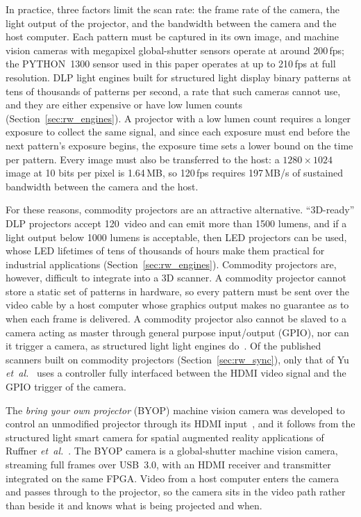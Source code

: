 \documentclass[10pt,journal,compsoc]{IEEEtran}
\newcommand{\SI}[2]{#1\,#2}
\begin{document}
In practice, three factors limit the scan rate: the frame rate of the camera, the light output of
the projector, and the bandwidth between the camera and the host computer. Each pattern must be
captured in its own image, and machine vision cameras with megapixel global-shutter sensors
operate at around \SI{200}{fps}; the PYTHON~1300 sensor used in this paper operates at up to
\SI{210}{fps} at full resolution. DLP light engines built for structured light display binary
patterns at tens of thousands of patterns per second, a rate that such cameras cannot use, and
they are either expensive or have low lumen counts (Section~\ref{sec:rw_engines}). A projector
with a low lumen count requires a longer exposure to collect the same signal, and since each
exposure must end before the next pattern's exposure begins, the exposure time sets a lower bound
on the time per pattern. Every image must also be transferred to the host: a $1280\times1024$
image at 10 bits per pixel is \SI{1.64}{MB}, so \SI{120}{fps} requires \SI{197}{MB/s} of
sustained bandwidth between the camera and the host.

For these reasons, commodity projectors are an attractive alternative. ``3D-ready'' DLP
projectors accept \SI{120}{\hertz} video and can emit more than 1500 lumens, and if a light
output below 1000 lumens is acceptable, then LED projectors can be used, whose LED lifetimes of
tens of thousands of hours make them practical for industrial applications
(Section~\ref{sec:rw_engines}).
Commodity projectors are, however, difficult to integrate into a 3D scanner. A commodity
projector cannot store a static set of patterns in hardware, so every pattern must be sent over
the video cable by a host computer whose graphics output makes no guarantee as to when each
frame is delivered. A commodity projector also cannot be slaved to a camera acting as master
through general purpose input/output (GPIO), nor can it trigger a camera, as structured light
light engines do~\cite{barreto2011dlp}. Of the published scanners built on commodity projectors
(Section~\ref{sec:rw_sync}), only that of Yu
\emph{et~al.}~\cite{yu2019dualspie,yu2020dualprojector} uses a controller fully interfaced between
the HDMI video signal and the GPIO trigger of the camera.

The \emph{bring your own projector} (BYOP) machine vision camera was developed to control an
unmodified projector through its HDMI input~\cite{lau2026byop}, and it follows from the
structured light smart camera for spatial augmented reality applications of Ruffner
\emph{et~al.}~\cite{ruffner2019smartcamera}. The BYOP camera is a
global-shutter machine vision camera, streaming full frames over USB~3.0, with an HDMI receiver
and transmitter integrated on the same FPGA. Video from a host computer enters the camera and
passes through to the projector, so the camera sits in the video path rather than beside it and
knows what is being projected and when.
\end{document}
